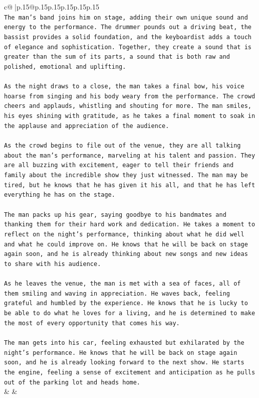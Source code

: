 \documentclass{article}
\begin{document}
{\begin{supertabular}{c@{$\;$}|p{.15\linewidth}@{}p{.15\linewidth}p{.15\linewidth}p{.15\linewidth}p{.15\linewidth}p{.15\linewidth}}
{{{\\ 
\texttt{The man's band joins him on stage, adding their own unique sound and energy to the performance. The drummer pounds out a driving beat, the bassist provides a solid foundation, and the keyboardist adds a touch of elegance and sophistication. Together, they create a sound that is greater than the sum of its parts, a sound that is both raw and polished, emotional and uplifting.} \\
\\ 
\texttt{As the night draws to a close, the man takes a final bow, his voice hoarse from singing and his body weary from the performance. The crowd cheers and applauds, whistling and shouting for more. The man smiles, his eyes shining with gratitude, as he takes a final moment to soak in the applause and appreciation of the audience.} \\
\\ 
\texttt{As the crowd begins to file out of the venue, they are all talking about the man's performance, marveling at his talent and passion. They are all buzzing with excitement, eager to tell their friends and family about the incredible show they just witnessed. The man may be tired, but he knows that he has given it his all, and that he has left everything he has on the stage.} \\
\\ 
\texttt{The man packs up his gear, saying goodbye to his bandmates and thanking them for their hard work and dedication. He takes a moment to reflect on the night's performance, thinking about what he did well and what he could improve on. He knows that he will be back on stage again soon, and he is already thinking about new songs and new ideas to share with his audience.} \\
\\ 
\texttt{As he leaves the venue, the man is met with a sea of faces, all of them smiling and waving in appreciation. He waves back, feeling grateful and humbled by the experience. He knows that he is lucky to be able to do what he loves for a living, and he is determined to make the most of every opportunity that comes his way.} \\
\\ 
\texttt{The man gets into his car, feeling exhausted but exhilarated by the night's performance. He knows that he will be back on stage again soon, and he is already looking forward to the next show. He starts the engine, feeling a sense of excitement and anticipation as he pulls out of the parking lot and heads home.} \\
            }
        }
    }
    & & \\ \\


\end{supertabular}}
\end{document}
